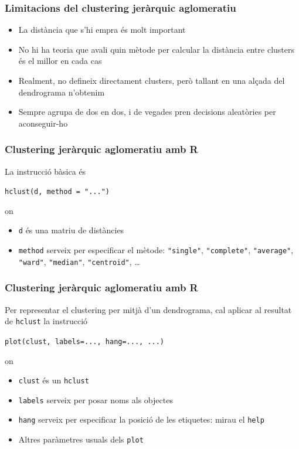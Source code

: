 \documentclass[12pt,t]{beamer}
\theoremstyle{plain}
\theoremstyle{definition}
\begin{document}
\begin{frame}
\frametitle{Limitacions del clustering jeràrquic aglomeratiu}
\begin{itemize}
\item La distància que s'hi empra és molt important
\medskip

\item No hi ha teoria que avali quin mètode per calcular la distància entre clusters és el millor en cada cas
\medskip

\item Realment, no defineix directament clusters, però tallant en una alçada del dendrograma n'obtenim
\medskip

\item Sempre agrupa de dos en dos, i de vegades pren decisions aleatòries per aconseguir-ho

\end{itemize}
\end{frame}

\begin{frame}[fragile]
\frametitle{Clustering jeràrquic aglomeratiu amb R}

La  instrucció bàsica és
\begin{center}
\verb?hclust(d, method = "...")?
\end{center}
on
\begin{itemize}
\item \texttt{d} és una matriu de distàncies
\medskip

\item \texttt{method} serveix per especificar el mètode:  \verb?"single"?,  \verb?"complete"?, \verb?"average"?, \verb?"ward"?, \verb?"median"?,  \verb?"centroid"?, \ldots
\end{itemize}
\end{frame}



\begin{frame}[fragile]
\frametitle{Clustering jeràrquic aglomeratiu amb R}

Per representar el clustering per mitjà d'un dendrograma, cal aplicar al resultat de \texttt{hclust} la instrucció
\begin{center}
\verb?plot(clust, labels=..., hang=..., ...)?
\end{center}
on
\begin{itemize}
\item \texttt{clust} és un \texttt{hclust}
\medskip

\item \texttt{labels} serveix per posar noms als objectes
\medskip

\item \texttt{hang} serveix per especificar la posició de les etiquetes: mirau el \texttt{help}

\item Altres paràmetres usuals dels \texttt{plot}
\end{itemize}

\end{frame}
\end{document}
